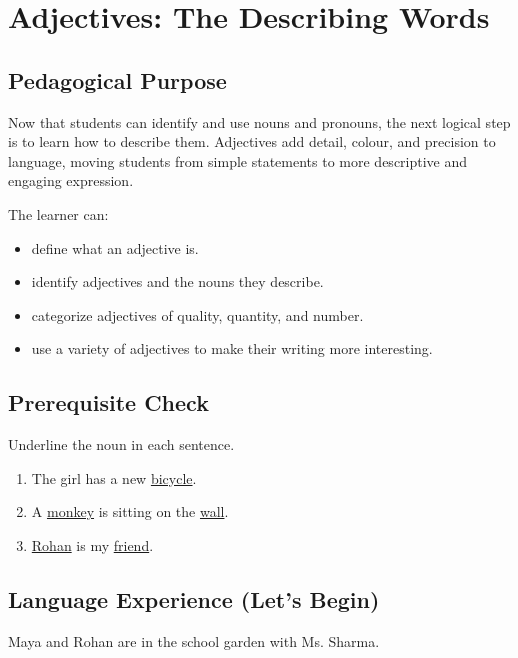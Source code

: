 
\chapter{Adjectives: The Describing Words}

\section{Pedagogical Purpose}
Now that students can identify and use nouns and pronouns, the next logical step is to learn how to describe them. Adjectives add detail, colour, and precision to language, moving students from simple statements to more descriptive and engaging expression.

\begin{learningobjectives}
The learner can:
\begin{itemize}
    \item define what an adjective is.
    \item identify adjectives and the nouns they describe.
    \item categorize adjectives of quality, quantity, and number.
    \item use a variety of adjectives to make their writing more interesting.
\end{itemize}
\end{learningobjectives}

\section{Prerequisite Check}
\begin{quickcheck}
Underline the noun in each sentence.
\begin{enumerate}
    \item The girl has a new \underline{bicycle}.
    \item A \underline{monkey} is sitting on the \underline{wall}.
    \item \underline{Rohan} is my \underline{friend}.
\end{enumerate}
\end{quickcheck}

\section{Language Experience (Let's Begin)}
Maya and Rohan are in the school garden with Ms. Sharma.

